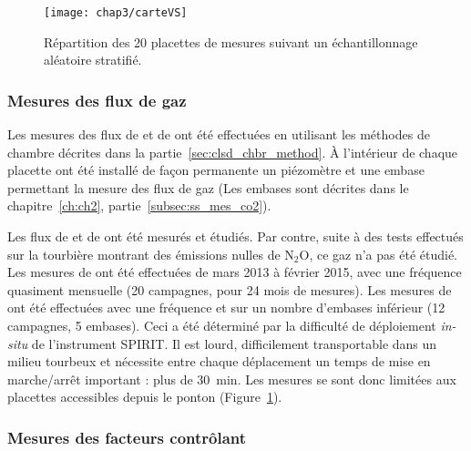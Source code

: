 \begin{figure}
\centering
\texttt{[image: chap3/carteVS]}
\caption{Répartition des 20 placettes de mesures suivant un échantillonnage aléatoire stratifié.}
\label{fig:carteVS}
\end{figure}

\subsubsection{Mesures des flux de gaz}

Les mesures des flux de \coo et de \chh ont été effectuées en utilisant les méthodes de chambre décrites dans la partie~\ref{sec:clsd_chbr_method}.
À l'intérieur de chaque placette ont été installé de façon permanente un piézomètre et une embase permettant la mesure des flux de gaz (Les embases sont décrites dans le chapitre~\ref{ch:ch2}, partie~\ref{subsec:ss_mes_co2}).


Les flux de \coo et de \chh ont été mesurés et étudiés.
Par contre, suite à des tests effectués sur la tourbière montrant des émissions nulles de N$_{2}$O, ce gaz n'a pas été étudié.
Les mesures de \coo ont été effectuées de mars 2013 à février 2015, avec une fréquence quasiment mensuelle (20 campagnes, pour 24 mois de mesures). Les mesures de \chh ont été effectuées avec une fréquence et sur un nombre d'embases inférieur (12 campagnes, 5 embases).
Ceci a été déterminé par la difficulté de déploiement \textit{in-situ} de l'instrument SPIRIT.
Il est lourd, difficilement transportable dans un milieu tourbeux et nécessite entre chaque déplacement un temps de mise en marche/arrêt important : plus de \SI{30}{\minute}.
Les mesures se sont donc limitées aux placettes accessibles depuis le ponton (Figure~\ref{fig:carteVS}).

\subsubsection{Mesures des facteurs contrôlant}

